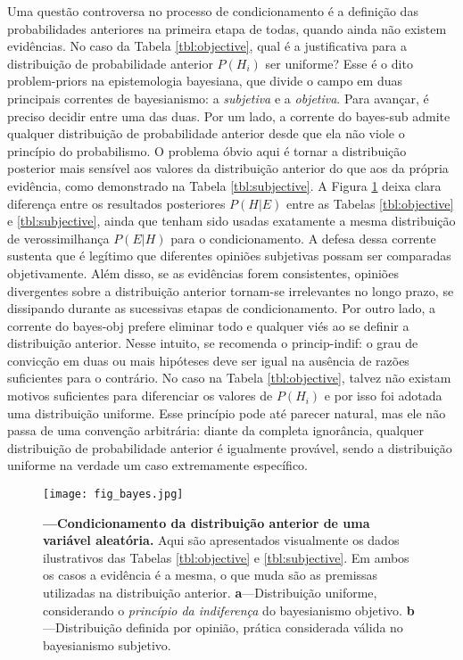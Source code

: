 \documentclass[./main.tex]{subfiles}
\begin{document}
\par Uma questão controversa no processo de condicionamento é a definição das probabilidades anteriores na primeira etapa de todas, quando ainda não existem evidências. No caso da Tabela \ref{tbl:objective}, qual é a justificativa para a distribuição de probabilidade anterior $P(H_i)$ ser uniforme? Esse é o dito \gls{problem-priors} na epistemologia bayesiana, que divide o campo em duas principais correntes de bayesianismo: a \textit{subjetiva} e a \textit{objetiva}. Para avançar, é preciso decidir entre uma das duas. Por um lado, a corrente do \gls{bayes-sub} admite qualquer distribuição de probabilidade anterior desde que ela não viole o princípio do probabilismo. O problema óbvio aqui é tornar a distribuição posterior mais sensível aos valores da distribuição anterior do que aos da própria evidência, como demonstrado na Tabela \ref{tbl:subjective}. A Figura \ref{fig:bayes} deixa clara diferença entre os resultados posteriores $P(H | E)$ entre as Tabelas \ref{tbl:objective} e \ref{tbl:subjective}, ainda que tenham sido usadas exatamente a mesma distribuição de verossimilhança $P(E | H)$ para o condicionamento. A defesa dessa corrente sustenta que é legítimo que diferentes opiniões subjetivas possam ser comparadas objetivamente. Além disso, se as evidências forem consistentes, opiniões divergentes sobre a distribuição anterior tornam-se irrelevantes no longo prazo, se dissipando durante as sucessivas etapas de condicionamento. Por outro lado, a corrente do \gls{bayes-obj} prefere eliminar todo e qualquer viés ao se definir a distribuição anterior. Nesse intuito, se recomenda o \gls{princip-indif}: o grau de convicção em duas ou mais hipóteses deve ser igual na ausência de razões suficientes para o contrário. No caso na Tabela \ref{tbl:objective},  talvez não existam motivos suficientes para diferenciar os valores de $P(H_i)$ e por isso foi adotada uma distribuição uniforme. Esse princípio pode até parecer natural, mas ele não passa de uma convenção arbitrária: diante da completa ignorância, qualquer distribuição de probabilidade anterior é igualmente provável, sendo a distribuição uniforme na verdade um caso extremamente específico.

\begin{figure}[t!] %
	\centering				
	\texttt{[image: fig\_bayes.jpg]}		
	\caption[Exemplo do condicionamento bayesiana]
	{\textbf{---\;Condicionamento da distribuição anterior de uma variável aleatória.}
        Aqui são apresentados visualmente os dados ilustrativos das Tabelas \ref{tbl:objective} e \ref{tbl:subjective}. Em ambos os casos a evidência é a mesma, o que muda são as premissas utilizadas na distribuição anterior. \;\textbf{a}\;---\;Distribuição uniforme, considerando o \textit{princípio da indiferença} do bayesianismo objetivo. \;\textbf{b}\;---\;Distribuição definida por opinião, prática considerada válida no bayesianismo subjetivo.  
	}
\label{fig:bayes}  %
\end{figure}
\end{document}

